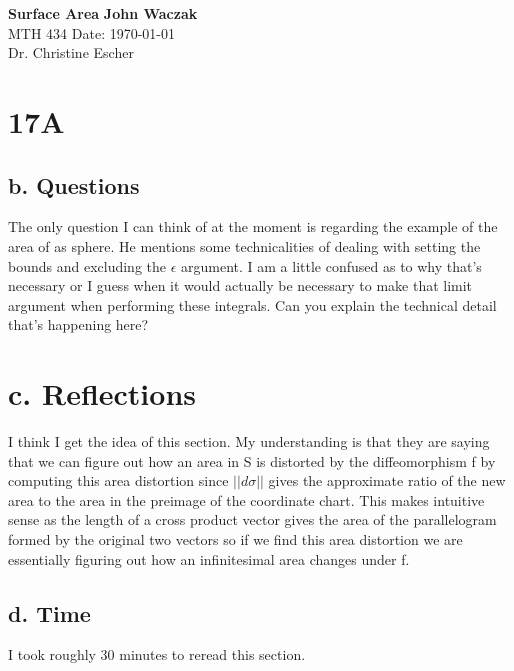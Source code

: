 \documentclass[a4paper, 11pt]{article}
\begin{document}
\noindent
\large\textbf{Surface Area} \hfill \textbf{John Waczak} \\
\normalsize MTH 434 \hfill  Date: \today \\
Dr. Christine Escher \\

\section*{17A}
	\subsection*{b. Questions}
	The only question I can think of at the moment is regarding the example of the area of as sphere. He mentions some technicalities of dealing with setting the bounds and excluding the $\epsilon$ argument. I am a little confused as to why that's necessary or I guess when it would actually be necessary to make that limit argument when performing these integrals. Can you explain the technical detail that's happening here? 
	
	\section*{c. Reflections}
	I think I get the idea of this section. My understanding is that they are saying that we can figure out how an area in S is distorted by the diffeomorphism f by computing this area distortion since $||d\sigma||$ gives the approximate ratio of the new area to the area in the preimage of the coordinate chart. This makes intuitive sense as the length of a cross product vector gives the area of the parallelogram formed by the original two vectors so if we find this area distortion we are essentially figuring out how an infinitesimal area changes under f.  
	\subsection*{d. Time}
	I took roughly 30 minutes to reread this section. 
\end{document}
